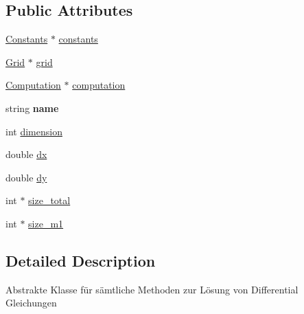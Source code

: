\subsection*{Public Attributes}
\begin{DoxyCompactItemize}
\item 
\hyperlink{classConstants}{Constants} $\ast$ \hyperlink{classSolver_af8791d3a5042e7be5980ae3247cb60de}{constants}
\item 
\hyperlink{classGrid}{Grid} $\ast$ \hyperlink{classSolver_a147ba19192faf8f24dadfc569f3d403f}{grid}
\item 
\hyperlink{classComputation}{Computation} $\ast$ \hyperlink{classSolver_a158efd10f04099b8be28561f990b646a}{computation}
\item 
\hypertarget{classSolver_a75135e4bd38563a60b6682856946b595}{string {\bfseries name}}\label{classSolver_a75135e4bd38563a60b6682856946b595}

\item 
int \hyperlink{classSolver_a9f81101cc1872e3da6b2f20fb678fa02}{dimension}
\item 
double \hyperlink{classSolver_a52a573400ef79611f2b7cf28e0a101ac}{dx}
\item 
double \hyperlink{classSolver_a716c9ccbc57382159d803e8fe7e9874b}{dy}
\item 
int $\ast$ \hyperlink{classSolver_accc6d00868567cda6fc234b3c1934a13}{size\-\_\-total}
\item 
int $\ast$ \hyperlink{classSolver_ab954613f6a40bbcbcbc7c04469f36db5}{size\-\_\-m1}
\end{DoxyCompactItemize}


\subsection{Detailed Description}
Abstrakte Klasse für sämtliche Methoden zur Lösung von Differential Gleichungen 

